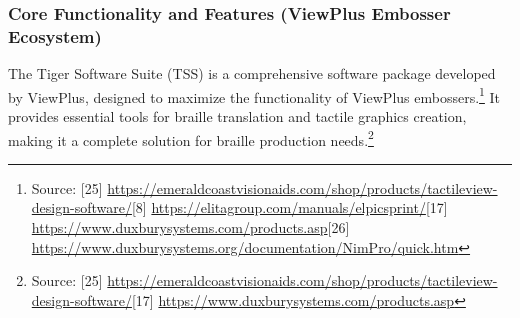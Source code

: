 \subsubsection{Core Functionality and Features (ViewPlus Embosser Ecosystem)}

The Tiger Software Suite (TSS) is a comprehensive software package developed by ViewPlus, designed to maximize the functionality of ViewPlus embossers.\footnote{Source: [25] \url{https://emeraldcoastvisionaids.com/shop/products/tactileview-design-software/}[8] \url{https://elitagroup.com/manuals/elpicsprint/}[17] \url{https://www.duxburysystems.com/products.asp}[26] \url{https://www.duxburysystems.org/documentation/NimPro/quick.htm}} It provides essential tools for braille translation and tactile graphics creation, making it a complete solution for braille production needs.\footnote{Source: [25] \url{https://emeraldcoastvisionaids.com/shop/products/tactileview-design-software/}[17] \url{https://www.duxburysystems.com/products.asp}}

